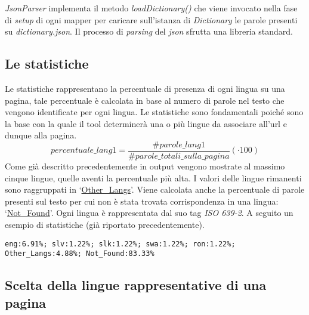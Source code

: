 \documentclass{article}
\newcommand{\isoTwo}{\textit{ISO 639-2}}
\newcommand{\filename}[1]{\textit{#1}}
\newcommand{\class}[1]{\textit{#1}}
\newcommand{\function}[1]{\textit{#1}}
\newcommand{\mintedstyle}[1]{\url{#1}}
\begin{document}
\noindent
\class{JsonParser} implementa il metodo \function{loadDictionary()} che viene invocato nella fase di \textit{setup} di ogni mapper per caricare sull'istanza di \class{Dictionary} le parole presenti su \filename{dictionary.json}. Il processo di \textit{parsing} del \textit{json} sfrutta una libreria standard.

\subsection{Le statistiche}
Le statistiche rappresentano la percentuale di presenza di ogni lingua su una pagina, tale percentuale è calcolata in base al numero di parole nel testo che vengono identificate per ogni lingua. Le statistiche sono fondamentali poiché sono la base con la quale il tool determinerà una o più lingue da associare all'url e dunque alla pagina. 
\begin{equation*}
     percentuale\_lang1 = \frac{\#parole\_lang1}{\#parole\_totali\_sulla\_pagina} (\cdot 100)
\end{equation*}
Come già descritto precedentemente in output vengono mostrate al massimo cinque lingue, quelle aventi la percentuale più alta. I valori delle lingue rimanenti sono raggruppati in `\mintedstyle{Other\_Langs}'. Viene calcolata anche la percentuale di parole presenti sul testo per cui non è stata trovata corrispondenza in una lingua: `\mintedstyle{Not\_Found}'. Ogni lingua è rappresentata dal suo tag \isoTwo{}. A seguito un esempio di statistiche (già riportato precedentemente).
\begin{verbatim}
eng:6.91%; slv:1.22%; slk:1.22%; swa:1.22%; ron:1.22%;
Other_Langs:4.88%; Not_Found:83.33%
\end{verbatim}

\subsection{Scelta della lingue rappresentative di una pagina}
\end{document}
